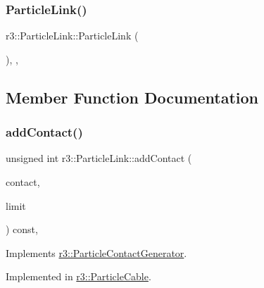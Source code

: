 \subsubsection{\texorpdfstring{Particle\+Link()}{ParticleLink()}}
{\footnotesize\ttfamily r3\+::\+Particle\+Link\+::\+Particle\+Link (\begin{DoxyParamCaption}{ }\end{DoxyParamCaption})\hspace{0.3cm}{\ttfamily [explicit]}, {\ttfamily [protected]}, {\ttfamily [default]}}



\subsection{Member Function Documentation}
\mbox{\label{classr3_1_1_particle_link_a07abe1381e0b5ed7e1597099dc0c072d}} 
\subsubsection{\texorpdfstring{add\+Contact()}{addContact()}}
{\footnotesize\ttfamily unsigned int r3\+::\+Particle\+Link\+::add\+Contact (\begin{DoxyParamCaption}\item[{\mbox{\hyperlink{classr3_1_1_particle_contact}{Particle\+Contact}} $\ast$}]{contact,  }\item[{unsigned int}]{limit }\end{DoxyParamCaption}) const\hspace{0.3cm}{\ttfamily [override]}, {}}



Implements \mbox{\hyperlink{classr3_1_1_particle_contact_generator_a3c9c99fb97a4431f0ddf300b30167d03}{r3\+::\+Particle\+Contact\+Generator}}.



Implemented in \mbox{\hyperlink{classr3_1_1_particle_cable_af8024236316ae2cf7bd68a0e906ed7c7}{r3\+::\+Particle\+Cable}}.

\mbox{\label{classr3_1_1_particle_link_a5ad76e8eb6f9b78e3589c74e5d5013fc}} 

